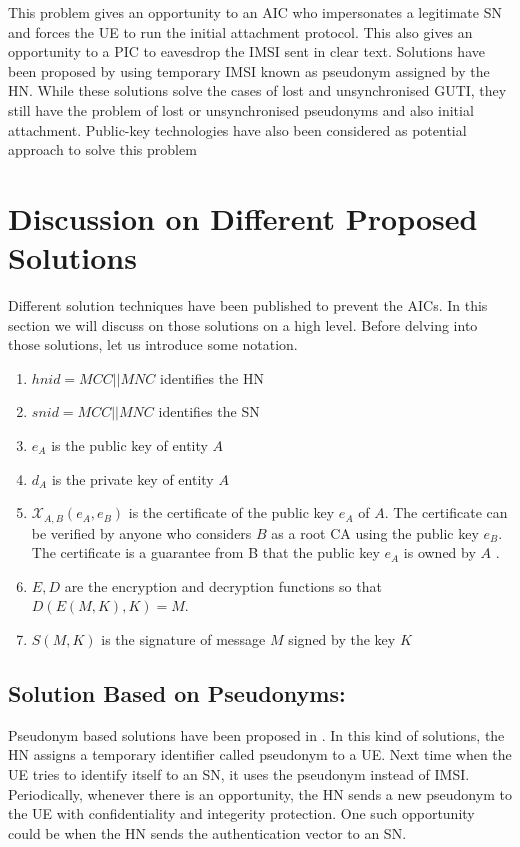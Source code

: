 \documentclass[runningheads,a4paper]{llncs} %
\begin{document}
This problem gives an opportunity to an AIC who impersonates a legitimate SN and forces the UE to run the initial attachment protocol. This also gives an opportunity to a PIC to eavesdrop the IMSI sent in clear text. Solutions \cite{pseudonym_valtteri_philip, pseudonym_ericsson} have been proposed by using temporary IMSI known as pseudonym assigned by the HN. While these solutions solve the cases of lost and unsynchronised GUTI, they still have the problem of lost or unsynchronised pseudonyms and also initial attachment. Public-key technologies have also been considered as potential approach to solve this problem




\section{Discussion on Different Proposed Solutions}\label{sec:solutions} 
\label{sec:existing_solutions}
Different solution techniques have been published to prevent the AICs. In this section we will discuss on those solutions on a high level. Before delving into those solutions, let us introduce some notation. 
\begin{enumerate}
\item $hnid=MCC||MNC$ identifies the HN
\item $snid=MCC||MNC$ identifies the SN
\item $e_A$ is the public key of entity $A$
\item $d_A$ is the private key of entity $A$ 
\item $\mathcal{X}_{A,B}(e_A,e_B)$ is the certificate of the public key $e_A$ of $A$. The certificate can be verified by anyone who considers $B$ as a root CA using the public key $e_B$. The certificate is a guarantee from B that the public key $e_A$ is owned by $A$ .
\item $E,D$ are the encryption and decryption functions so that $D(E(M,K),K) = M$.
\item $S(M,K)$ is the signature of message $M$ signed by the key $K$
\end{enumerate}

\subsection{Solution Based on Pseudonyms:}
\label{sec:pseudonyms}
Pseudonym based solutions have been proposed in \citep{pseudonym_ericsson,pseudonym_valtteri_philip}. In this kind of solutions, the HN assigns a temporary identifier called pseudonym to a UE. Next time when the UE tries to identify itself to an  SN, it uses the pseudonym instead of IMSI. Periodically, whenever there is an opportunity, the HN sends a new pseudonym to the UE with confidentiality and integerity protection. One such opportunity could be when the HN sends the authentication vector to an SN.
\end{document}
